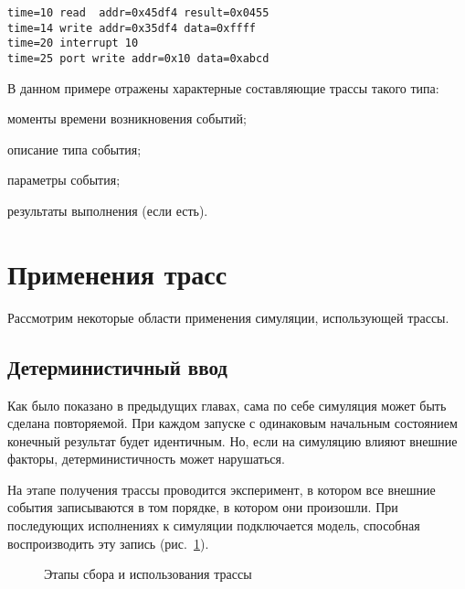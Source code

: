 \begin{lstlisting}
time=10 read  addr=0x45df4 result=0x0455
time=14 write addr=0x35df4 data=0xffff
time=20 interrupt 10
time=25 port write addr=0x10 data=0xabcd
\end{lstlisting}

В данном примере отражены характерные составляющие трассы такого типа:
\begin{itemize*}
    \item моменты времени возникновения событий;
    \item описание типа события;
    \item параметры события;
    \item результаты выполнения (если есть).
\end{itemize*}

\section{Применения трасс}

Рассмотрим некоторые области применения симуляции, использующей трассы.

\subsection{Детерминистичный ввод}

Как было показано в предыдущих главах, сама по себе симуляция может быть сделана повторяемой. При каждом запуске с одинаковым начальным состоянием конечный результат будет идентичным. Но, если на симуляцию влияют внешние факторы, детерминистичность может нарушаться.

На этапе получения трассы проводится эксперимент, в котором все внешние события записываются в том порядке, в котором они произошли. При последующих исполнениях к симуляции подключается модель, способная воспроизводить эту запись (рис.~\ref{fig:trace-collection}).

\begin{figure}[htp]
    \centering
    \caption[Этапы сбора и использования трассы]{Этапы сбора и использования трассы}
    \label{fig:trace-collection}
\end{figure}


